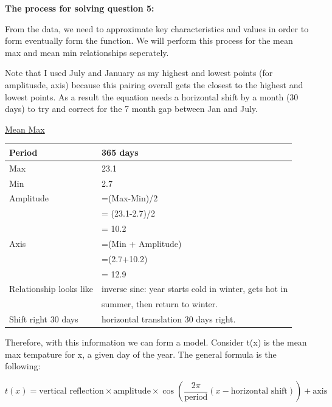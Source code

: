 \documentclass[12pt]{book}
\begin{document}
\begin{enumerate}
\vspace{0.3cm}
\textbf{The process for solving question 5:}

\vspace{0.3cm}
From the data, we need to approximate key characteristics and values in order to form 
eventually form the function. We will perform this process for the mean max and mean 
min relationships seperately.

\vspace{0.3cm}
Note that I used July and January as my highest and lowest points (for amplitusde, axis) 
because this pairing overall gets the closest to the highest and lowest points. As a result 
the equation needs a horizontal shift by a month (30 days) to try and correct for the 7 month 
gap between Jan and July.

\vspace{0.3cm}
\underline{Mean Max}

\vspace{0.3cm}
\begin{tabular}{|l|l|}
    \hline
    Period & 365 days \\
    \hline
    Max & 23.1 \\
    \hline
    Min & 2.7 \\
    \hline
    Amplitude & =(Max-Min)/2\\
    & = (23.1-2.7)/2 \\
    & = 10.2 \\
    \hline
    Axis & =(Min + Amplitude)\\
    & =(2.7+10.2) \\
    & = 12.9 \\
    \hline
    Relationship looks like & inverse sine: year starts cold in winter, gets hot in \\
    & summer, then return to winter. \\
    \hline
    Shift right 30 days & horizontal translation 30 days right. \\
    \hline
\end{tabular}

\newpage

\vspace{0.3cm}
Therefore, with this information we can form a model. 
Consider t(x) is the mean max tempature for x, a given day of the year. 
The general formula is the following:

$$t(x) = \text{vertical reflection} \times \text{amplitude} \times \cos\left( \dfrac{2\pi}{\text{period}}  (x - \text{horizontal shift}) \right) + \text{axis}$$


\end{enumerate}
\end{document}
